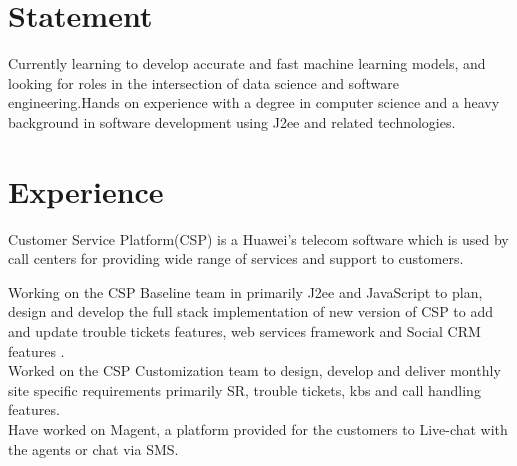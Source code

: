 \documentclass[]{deedy-resume-openfont}
\begin{document}
\begin{minipage}[t]{0.66\textwidth} 


\section{Statement}
Currently learning to develop accurate and fast machine learning models, and looking for roles in the intersection of data science and software engineering.Hands on experience with a degree in computer science and a heavy background in software development using J2ee and related technologies.
\sectionsep




\section{Experience}

\sectionsep
\runsubsection{}
Customer Service Platform(CSP) is a Huawei's telecom software which is used by call centers for providing wide range of services and support to customers.\\
\vspace{\topsep} %

Working on the CSP Baseline team in primarily J2ee and JavaScript to plan, design and develop the full stack implementation of new version of CSP to add and update trouble tickets features,  web services framework and Social CRM features .\\Worked on the CSP Customization  team  to design, develop and deliver monthly site specific requirements primarily SR, trouble tickets, kbs and call handling features.\\Have worked on Magent, a  platform provided for the customers to Live-chat with the agents or chat via SMS.

\sectionsep


\runsubsection{}


\end{minipage}
\end{document}
